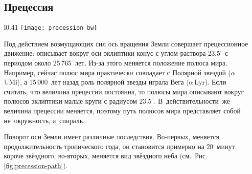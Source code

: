 \subsection{Прецессия}
\begin{wrapfigure}[15]{l}{0.41\tw}
	\vspace{-1pc}
	\centering
	\texttt{[image: precession\_bw]}
	\caption{Прецессионное движение северного полюса мира}
	\label{fig:precession-path}
\end{wrapfigure}
Под действием возмущающих сил ось вращения Земли совершает прецессионное движение: описывает вокруг оси эклиптики конус с углом раствора $23.5^\circ$ с периодом около  25\,765~лет. Из-за этого меняется положение полюса мира. Например, сейчас полюс мира практически совпадает с Полярной звездой ($\alpha$\,UMi), а 15\,000~лет назад роль полярной звезды играла Вега ($\alpha$\,Lyr). Если считать, что величина прецессии постоянна, то полюсы мира описывают вокруг полюсов эклиптики малые круги с радиусом $23.5^\circ$. В~действительности~же величина прецессии меняется, поэтому путь полюсов мира представляет собой не~окружность, а~спираль.

Поворот оси Земли имеет различные последствия. Во-первых, меняется продолжительность тропического года, он становится примерно на $20$~минут короче звёздного, во-вторых, меняется вид звёздного неба  (см.~Рис.\,\ref{fig:precession-path}).
